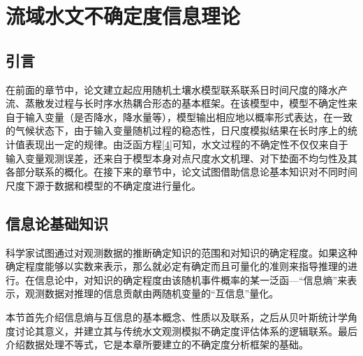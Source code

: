 

\chapter{流域水文不确定度信息理论}
\label{cha:china}
\section{引言}
在前面的章节中，论文建立起应用随机土壤水模型联系联系日时间尺度的降水产流、蒸散发过程与长时序水热耦合形态的基本框架。在该模型中，模型不确定性来自于输入变量（是否降水，降水量等），模型输出相应地以概率形式表达，在一致的气候状态下，由于输入变量随机过程的稳态性，日尺度模拟结果在长时序上的统计值表现出一定的规律。由泛函方程\ref{4}可知，水文过程的不确定性不仅仅来自于输入变量观测误差，还来自于模型本身对点尺度水文机理、对下垫面不均匀性及其各部分联系的概化。在接下来的章节中，论文试图借助信息论基本知识对不同时间尺度下源于数据和模型的不确定度进行量化。

\section{信息论基础知识}
\iffalse
\begin{quotation}
There is only one constant preoccupation: I have throughout been anxious to discover how much we can be said to know and with what degree of certainty of doubtfulness.
\end{quotation}
\rightline{ —— Bertrand Russell, My Philosophical Development}
\begin{quotation}
If degree of plausibility are represented by real numbers, then there is a uniquely determined set of quantitative rules for conducting inference.
\end{quotation}
\rightline{ —— E.T. Jaynes , Probability Theory, The Logic of Science}
\fi
科学家试图通过对观测数据的推断确定知识的范围和对知识的确定程度\cite{russell1995my}。如果这种确定程度能够以实数来表示，那么就必定有确定而且可量化的准则来指导推理的进行\cite{jaynes2003probability}。在信息论中，对知识的确定程度由该随机事件概率的某一泛函---``信息熵''来表示，观测数据对推理的信息贡献由两随机变量的``互信息''量化。

本节首先介绍信息熵与互信息的基本概念、性质以及联系，之后从贝叶斯统计学角度讨论其意义，并建立其与传统水文观测模拟不确定度评估体系的逻辑联系。最后介绍数据处理不等式，它是本章所要建立的不确定度分析框架的基础。

